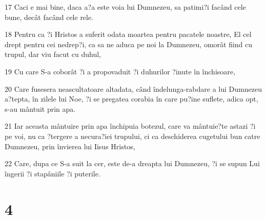 \par 17 Caci e mai bine, daca a?a este voia lui Dumnezeu, sa patimi?i facând cele bune, decât facând cele rele.
\par 18 Pentru ca ?i Hristos a suferit odata moartea pentru pacatele noastre, El cel drept pentru cei nedrep?i, ca sa ne aduca pe noi la Dumnezeu, omorât fiind cu trupul, dar viu facut cu duhul,
\par 19 Cu care S-a coborât ?i a propovaduit ?i duhurilor ?inute în închisoare,
\par 20 Care fusesera neascultatoare altadata, când îndelunga-rabdare a lui Dumnezeu a?tepta, în zilele lui Noe, ?i se pregatea corabia în care pu?ine suflete, adica opt, s-au mântuit prin apa.
\par 21 Iar aceasta mântuire prin apa închipuia botezul, care va mântuie?te astazi ?i pe voi, nu ca ?tergere a necura?iei trupului, ci ca deschiderea cugetului bun catre Dumnezeu, prin învierea lui Iisus Hristos,
\par 22 Care, dupa ce S-a suit la cer, este de-a dreapta lui Dumnezeu, ?i se supun Lui îngerii ?i stapâniile ?i puterile.

\chapter{4}

